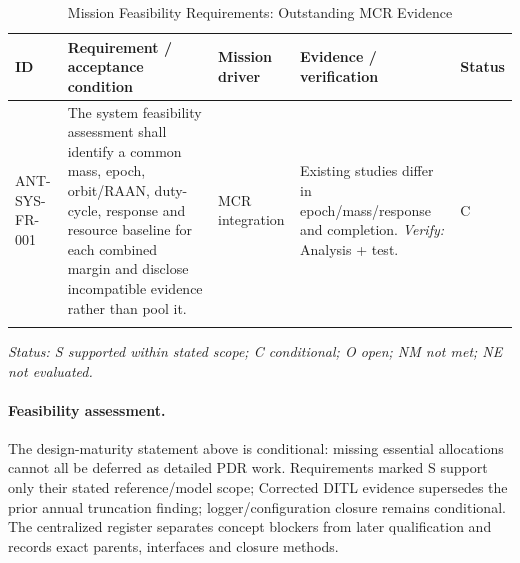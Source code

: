 \begin{table}[H]\centering\small\setlength{\tabcolsep}{3pt}
\caption{Mission Feasibility Requirements: Outstanding MCR Evidence}\label{tab:fr-sys}
\begin{tabular}{@{}
>{\RaggedRight\arraybackslash}p{}
>{\RaggedRight\arraybackslash}p{}
>{\RaggedRight\arraybackslash}p{}
>{\RaggedRight\arraybackslash}p{}
>{\RaggedRight\arraybackslash}p{}
@{}}
\toprule ID & Requirement / acceptance condition & Mission driver & Evidence / verification & Status\\\midrule
{}\label{req:ANT-SYS-FR-001}\mbox{ANT-SYS-}\newline\mbox{FR-001} & The system feasibility assessment shall identify a common mass, epoch, orbit/RAAN, duty-cycle, response and resource baseline for each combined margin and disclose incompatible evidence rather than pool it. & MCR integration & Existing studies differ in epoch/mass/response and completion. \emph{Verify:} Analysis + test. & C\\
\addlinespace[3pt]
\bottomrule
\end{tabular}
\end{table}
\textit{Status: S supported within stated scope; C conditional; O open; NM not met; NE not evaluated.}
\paragraph{Feasibility assessment.} The design-maturity statement above is conditional: missing essential allocations cannot all be deferred as detailed PDR work. Requirements marked S support only their stated reference/model scope; Corrected DITL evidence supersedes the prior annual truncation finding; logger/configuration closure remains conditional. The centralized register separates concept blockers from later qualification and records exact parents, interfaces and closure methods.
